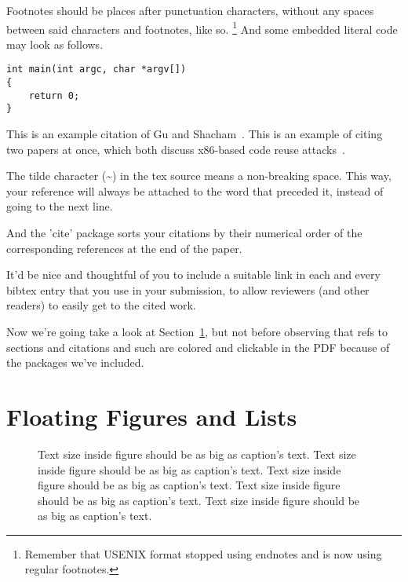 Footnotes should be places after punctuation characters, without any
spaces between said characters and footnotes, like so.%
\footnote{Remember that USENIX format stopped using endnotes and is
  now using regular footnotes.} And some embedded literal code may
look as follows.

\begin{verbatim}
int main(int argc, char *argv[]) 
{
    return 0;
}
\end{verbatim}

This is an example citation of Gu and Shacham~\cite{gu20ropriscv}. This is an
example of citing two papers at once, which both discuss x86-based code reuse
attacks~\cite{shacham07ropx86,bletsch11jopx86}.

The tilde character (\~{}) in the tex source means a non-breaking
space. This way, your reference will always be attached to the word
that preceded it, instead of going to the next line.

And the 'cite' package sorts your citations by their numerical order
of the corresponding references at the end of the paper.

It'd be nice and thoughtful of you to include a suitable link in each
and every bibtex entry that you use in your submission, to allow
reviewers (and other readers) to easily get to the cited work.

Now we're going take a look at Section~\ref{sec:figs}, but not before
observing that refs to sections and citations and such are colored and
clickable in the PDF because of the packages we've included.

\section{Floating Figures and Lists}
\label{sec:figs}


\begin{figure}
\begin{center}
\end{center}
\caption{\label{fig:vectors} Text size inside figure should be as big as
  caption's text. Text size inside figure should be as big as
  caption's text. Text size inside figure should be as big as
  caption's text. Text size inside figure should be as big as
  caption's text. Text size inside figure should be as big as
  caption's text. }
\end{figure}


